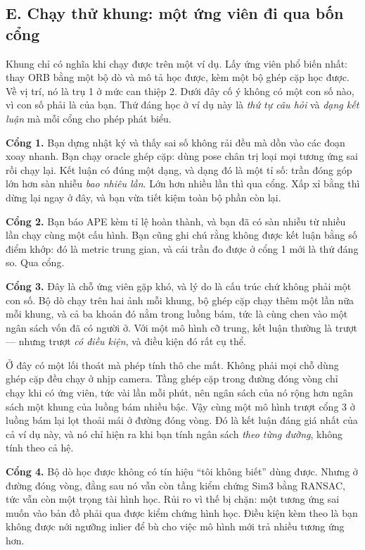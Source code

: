 \documentclass[../../deep_learning.tex]{subfiles}
\begin{document}
\subsection{E. Chạy thử khung: một ứng viên đi qua bốn cổng}
Khung chỉ có nghĩa khi chạy được trên một ví dụ. Lấy ứng viên phổ biến nhất: thay ORB bằng một bộ dò và mô tả học được, kèm một bộ ghép cặp học được. Về vị trí, nó là trụ 1 ở mức can thiệp 2. Dưới đây cố ý không có một con số nào, vì con số phải là của bạn. Thứ đáng học ở ví dụ này là \emph{thứ tự câu hỏi} và \emph{dạng kết luận} mà mỗi cổng cho phép phát biểu.

\textbf{Cổng 1.} Bạn dựng nhật ký và thấy sai số không rải đều mà dồn vào các đoạn xoay nhanh. Bạn chạy oracle ghép cặp: dùng pose chân trị loại mọi tương ứng sai rồi chạy lại. Kết luận có đúng một dạng, và dạng đó là một tỉ số: trần đóng góp lớn hơn sàn nhiễu \emph{bao nhiêu lần}. Lớn hơn nhiều lần thì qua cổng. Xấp xỉ bằng thì dừng lại ngay ở đây, và bạn vừa tiết kiệm toàn bộ phần còn lại.

\textbf{Cổng 2.} Bạn báo APE kèm tỉ lệ hoàn thành, và bạn đã có sàn nhiễu từ nhiều lần chạy cùng một cấu hình. Bạn cũng ghi chú rằng không được kết luận bằng số điểm khớp: đó là metric trung gian, và cái trần đo được ở cổng 1 mới là thứ đáng so. Qua cổng.

\textbf{Cổng 3.} Đây là chỗ ứng viên gặp khó, và lý do là cấu trúc chứ không phải một con số. Bộ dò chạy trên hai ảnh mỗi khung, bộ ghép cặp chạy thêm một lần nữa mỗi khung, và cả ba khoản đó nằm trong luồng bám, tức là cùng chen vào một ngân sách vốn đã có người ở. Với một mô hình cỡ trung, kết luận thường là trượt --- nhưng trượt \emph{có điều kiện}, và điều kiện đó rất cụ thể.

Ở đây có một lối thoát mà phép tính thô che mất. Không phải mọi chỗ dùng ghép cặp đều chạy ở nhịp camera. Tầng ghép cặp trong đường đóng vòng chỉ chạy khi có ứng viên, tức vài lần mỗi phút, nên ngân sách của nó rộng hơn ngân sách một khung của luồng bám nhiều bậc. Vậy cùng một mô hình trượt cổng 3 ở luồng bám lại lọt thoải mái ở đường đóng vòng. Đó là kết luận đáng giá nhất của cả ví dụ này, và nó chỉ hiện ra khi bạn tính ngân sách \emph{theo từng đường}, không tính theo cả hệ.

\textbf{Cổng 4.} Bộ dò học được không có tín hiệu ``tôi không biết'' dùng được. Nhưng ở đường đóng vòng, đằng sau nó vẫn còn tầng kiểm chứng Sim3 bằng RANSAC, tức vẫn còn một trọng tài hình học. Rủi ro vì thế bị chặn: một tương ứng sai muốn vào bản đồ phải qua được kiểm chứng hình học. Điều kiện kèm theo là bạn không được nới ngưỡng inlier để bù cho việc mô hình mới trả nhiều tương ứng hơn.
\end{document}
